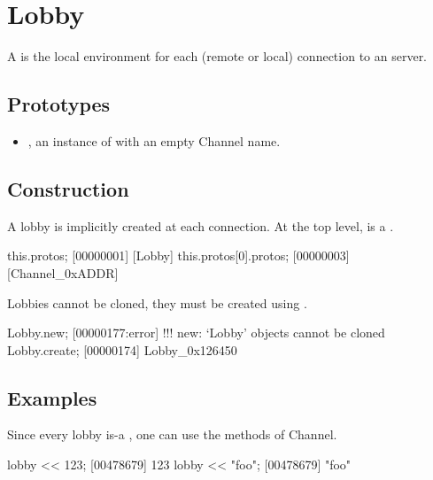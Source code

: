 
\section{Lobby}

A  is the local environment for each (remote or local)
connection to an \urbi server.

\subsection{Prototypes}
\begin{itemize}
\item {}, an instance of 
  with an empty Channel name.
\end{itemize}

\subsection{Construction}

A lobby is implicitly created at each connection. At the top level,
\this is a .

\begin{urbiscript}
this.protos;
[00000001] [Lobby]
this.protos[0].protos;
[00000003] [Channel_0xADDR]
\end{urbiscript}

Lobbies cannot be cloned, they must be created using .

\begin{urbiscript}
Lobby.new;
[00000177:error] !!! new: `Lobby' objects cannot be cloned
Lobby.create;
[00000174] Lobby_0x126450
\end{urbiscript}


\subsection{Examples}

Since every lobby is-a , one can use the methods of
Channel.

\begin{urbiscript}
lobby << 123;
[00478679] 123
lobby << "foo";
[00478679] "foo"
\end{urbiscript}

